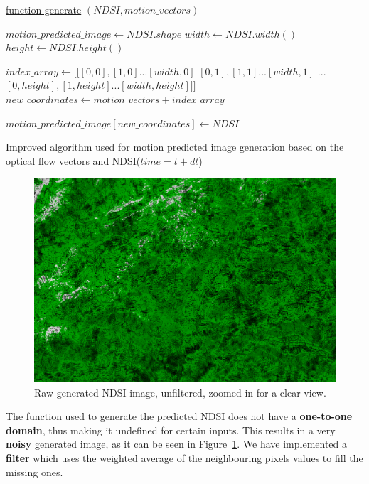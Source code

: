 \documentclass[12pt, a4paper]{report}
\begin{document}
	
	\begin{algorithm}
		
		\underline{function generate} $(NDSI, motion\_vectors)$\;
		
		$motion\_predicted\_image \gets NDSI.shape$\;
		$width \gets NDSI.width()$\;
		$height \gets NDSI.height()$\;
		
		$index\_array \gets [[[0, 0], [1, 0] ... [width, 0]$
		$[0, 1], [1, 1] ... [width, 1]$
		$...$
		$[0, height], [1, height] ... [width, height]]]$\;
		$new\_coordinates \gets motion\_vectors + index\_array$\;
		
		$motion\_predicted\_image[new\_coordinates] \gets NDSI$\;
		
		\;
		
		\caption{Improved algorithm used for motion predicted image generation based on the optical flow vectors and NDSI(\(time=t+dt\))}
		\label{algo:improved_generation}
	\end{algorithm}
	
	\begin{figure}[h!]
		\centering
		\includegraphics[width=\linewidth]{../images/LC81940282015363LGN02_Motion Predicted NDSI_unfiltered_small.png}
		\caption{Raw generated NDSI image, unfiltered, zoomed in for a clear view.}
		\label{fig:unfiltered_small}
	\end{figure}
	
	
	\par The function used to generate the predicted NDSI does not have a \textbf{one-to-one domain}, thus making it undefined for certain inputs. This results in a very \textbf{noisy} generated image, as it can be seen in Figure~\ref{fig:unfiltered_small}. We have implemented a \textbf{filter} which uses the weighted average of the neighbouring pixels values to fill the missing ones.
	
\end{document}
